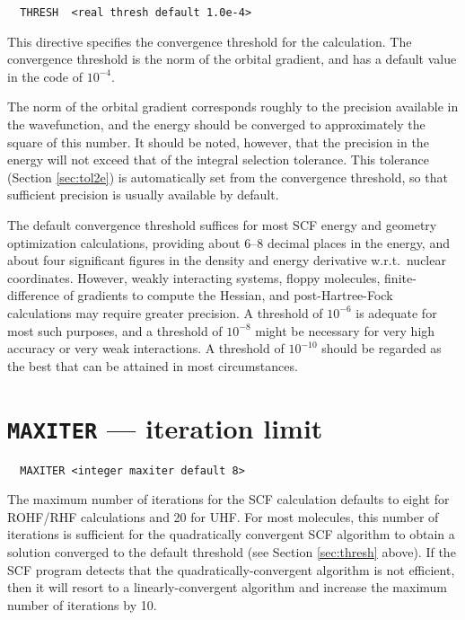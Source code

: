 \begin{verbatim}
  THRESH  <real thresh default 1.0e-4>
\end{verbatim}

This directive specifies the convergence threshold for the
calculation.  The convergence threshold is the norm of the orbital
gradient, and has a default value in the code of $10^{-4}$.

The norm of the orbital gradient corresponds roughly to the precision
available in the wavefunction, and the energy should be converged to
approximately the square of this number.  It should be noted, however,
that the precision in the energy will not exceed that of the integral
selection tolerance.  This tolerance (Section \ref{sec:tol2e}) is
automatically set from the convergence threshold, so that sufficient
precision is usually available by default.

The default convergence threshold suffices for most SCF energy and
geometry optimization calculations, providing about 6--8 decimal
places in the energy, and about four significant figures in the
density and energy derivative w.r.t.\ nuclear coordinates.  However,
weakly interacting systems, floppy molecules, finite-difference of
gradients to compute the Hessian, and post-Hartree-Fock calculations
may require greater precision.  A threshold of $10^{-6}$ is adequate
for most such purposes, and a threshold of $10^{-8}$ might be
necessary for very high accuracy or very weak interactions.  A
threshold of $10^{-10}$ should be regarded as the best that can be
attained in most circumstances.

\section{{\tt MAXITER} --- iteration limit}
\label{sec:max}

\begin{verbatim}
  MAXITER <integer maxiter default 8>
\end{verbatim}

\sloppy

The maximum number of iterations for the SCF calculation defaults to
eight for ROHF/RHF calculations and 20 for UHF.  For most molecules,
this number of iterations is sufficient for the quadratically
convergent SCF algorithm to obtain a solution converged to the
default threshold (see Section \ref{sec:thresh} above).  If the SCF
program detects that the quad\-ratically-con\-ver\-gent algorithm is not
efficient, then it will resort to a lin\-early-con\-ver\-gent algorithm and
increase the maximum number of iterations by 10.

